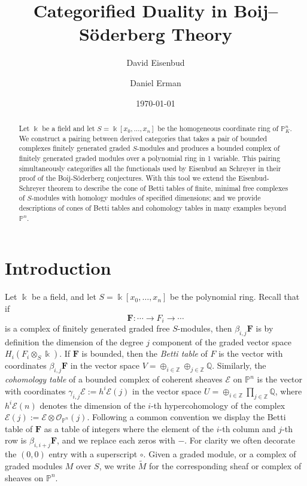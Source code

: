\documentclass[12pt]{amsart}
\title{Categorified Duality in Boij--S\"oderberg Theory}
\author{David Eisenbud}
\author{Daniel Erman}\thanks{First author supported by an NSF and second author supported by an NSF and by Simons \dots}
\date{\today}
\theoremstyle{definition}
\theoremstyle{remark}
\newcommand{\kk}{\Bbbk}
\newcommand{\PP}{\mathbb{P}}
\newcommand{\ZZ}{\mathbb{Z}}
\newcommand{\QQ}{\mathbb{Q}}
\newcommand{\cO}{\mathcal{O}}
\newcommand{\cE}{\mathcal{E}}
\newcommand{\FF}{\mathbf{F}}
\begin{document}
\maketitle



\begin{abstract} Let $\kk$ be a field and let $S = \kk[x_{0}, \dots,x_{n}]$ be the homogeneous coordinate ring of $\PP^{n}_{K}$.
We construct a pairing between derived categories that takes a pair of bounded complexes
finitely generated graded $S$-modules and produces a bounded complex of finitely generated graded modules over a polynomial ring in 1 variable. This pairing simultaneously categorifies all the functionals used by Eisenbud an Schreyer in their proof of the Boij-S\"oderberg conjectures. With this tool we extend the Eisenbud-Schreyer theorem to describe the cone of Betti tables of finite, minimal free complexes of $S$-modules with homology modules of specified dimensions;  and we provide descriptions of cones of Betti tables and cohomology tables in many examples beyond $\PP^n$.
\end{abstract}


\section*{Introduction}
Let $\kk$ be a field, and let $S=\kk[x_0, \dots, x_n]$ be the polynomial ring. Recall that if 
$$
\FF: \cdots \to F_{i}\to \cdots
$$
is a complex of finitely generated graded free $S$-modules, then $\beta_{i,j}\FF$ is by definition the dimension of the degree $j$ component of the graded vector space $H_{i}(F_{i}\otimes_{S}\kk)$. If $\FF$ is bounded, then the \emph{Betti table} of $F$ is the vector with coordinates $\beta_{i,j}\FF$ in the vector space $V = \oplus_{i\in \ZZ} \oplus_{j\in \ZZ}\QQ$. Similarly, the \emph{cohomology table} of a bounded complex of coherent sheaves $\cE$ on $\PP^{n}$ is the vector with coordinates $\gamma_{i,j}\cE := h^{i}\cE(j)$ in the vector space $U = \oplus_{i\in \ZZ}\prod_{j\in \ZZ}\QQ$, where $h^{i}\cE(n)$ denotes the dimension of the $i$-th hypercohomology of the complex $\cE(j) := \cE \otimes \cO_{\PP^{n}}(j)$. Following a common convention we display the Betti table of $\FF$ as a table
of integers where the element of the $i$-th column and $j$-th row is $\beta_{i,i+j}\FF$, and we replace each zeros with $-$. For clarity we often decorate the $(0,0)$ entry
with a superscript $\circ$.
Given a graded module, or a complex of graded modules $M$ over $S$, we write $\widetilde M$ for the corresponding sheaf or complex of sheaves on $\PP^{n}$. 
\end{document}
